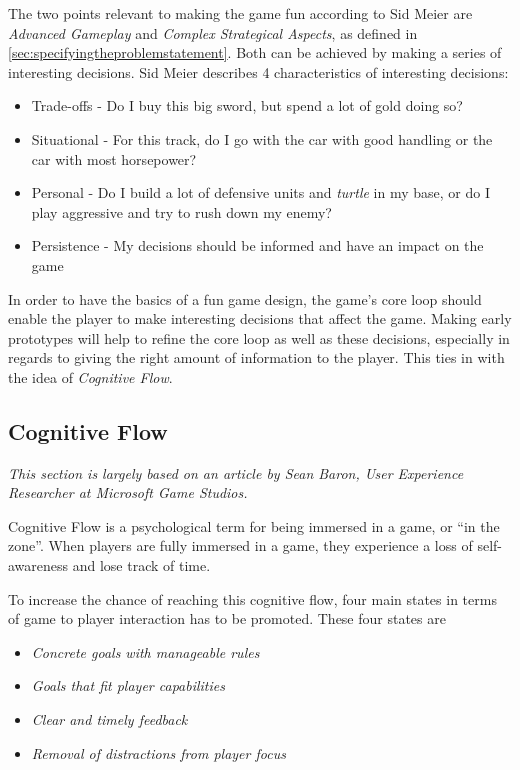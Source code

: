 The two points relevant to making the game fun according to Sid Meier are \textit{Advanced Gameplay} and \textit{Complex Strategical Aspects}, as defined in \ref{sec:specifyingtheproblemstatement}.
Both can be achieved by making a series of interesting decisions.
Sid Meier describes 4 characteristics of interesting decisions: 
\begin{itemize}
	\item Trade-offs - Do I buy this big sword, but spend a lot of gold doing so?
	\item Situational - For this track, do I go with the car with good handling or the car with most horsepower?
	\item Personal - Do I build a lot of defensive units and \textit{turtle}  in my base, or do I play aggressive and try to rush down my enemy?
	\item Persistence - My decisions should be informed and have an impact on the game
\end{itemize}

In order to have the basics of a fun game design, the game's core loop should enable the player to make interesting decisions that affect the game.
Making early prototypes will help to refine the core loop as well as these decisions, especially in regards to giving the right amount of information to the player.
This ties in with the idea of \textit{Cognitive Flow}.

\subsection{Cognitive Flow}
\emph{This section is largely based on an article by Sean Baron, User Experience Researcher at Microsoft Game
Studios\cite{baron}.}

Cognitive Flow is a psychological term for being immersed in a game, or ``in the zone''.
When players are fully immersed in a game, they experience a loss of self-awareness and lose track of time.

To increase the chance of reaching this cognitive flow, four main states in terms of game to player interaction has to
be promoted.  
These four states are 
\begin{itemize}
    \item \emph{Concrete goals with manageable rules}
    \item \emph{Goals that fit player capabilities}
    \item \emph{Clear and timely feedback}
    \item \emph{Removal of distractions from player focus}
\end{itemize}

